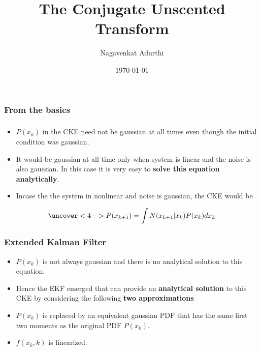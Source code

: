 \documentclass[11pt]{beamer}
\title[The Conjugate Unscented Transform]{The Conjugate Unscented Transform }
\date{\today}
\author[Nagavenkat Adurthi]{Nagavenkat Adurthi}
\institute
{
  Department of Mechanical \& Aerospace Engineering\\
  University at Buffalo
}
\begin{document}
\frame{\maketitle} %



\begin{frame}
\frametitle{From the basics }


\end{frame}
\begin{frame}
\frametitle{ }
\begin{itemize}[<+->]
	\item $P(x_k)$ in the CKE need not be gaussian at all times even though the initial condition was gaussian. 
	\item It would be gaussian at all time only when system is linear and the noise is also gaussian. In this case it is very easy to {\bf solve this equation analytically}.
	\item Incase the  the system in nonlinear and noise is gaussian, the CKE would be
\end{itemize}

	\begin{align*}
	\uncover<4->{P(x_{k+1})=\int{N(x_{k+1}|x_k)P(x_k)}dx_k}
	\end{align*}
\end{frame}
\begin{frame}
\frametitle{Extended Kalman Filter}
\begin{itemize}[<+->]
	\item $P(x_k)$ is not always gaussian and there is no analytical solution to this equation. 
	\item Hence the EKF emerged that can provide an {\bf analytical solution} to this CKE by considering the following {\bf two approximations}
	\item $P(x_k)$ is replaced by an equivalent gaussian PDF that has the same first two moments as the original PDF $P(x_k)$.
  \item $f(x_k,k)$ is linearized.
\end{itemize}
\end{frame}
\end{document}
